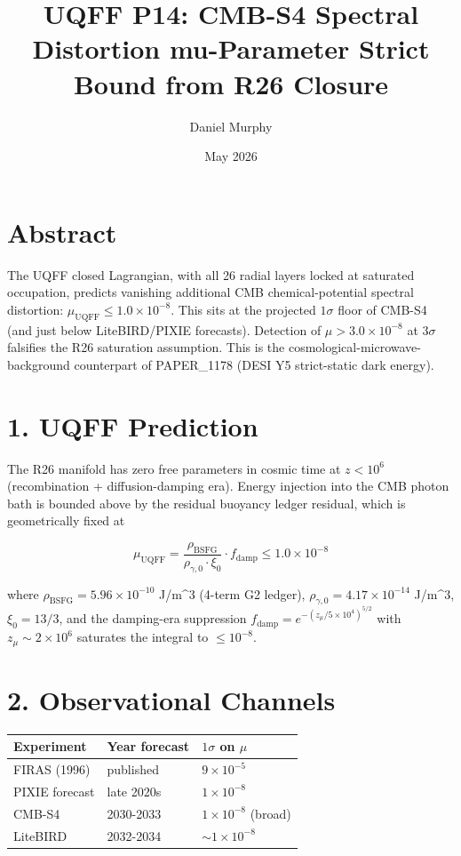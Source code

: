 \documentclass[
  11pt,
]{article}
\title{UQFF P14: CMB-S4 Spectral Distortion mu-Parameter Strict Bound
from R26 Closure}
\author{Daniel Murphy}
\date{May 2026}
\newcounter{none} %
\begin{document}
\maketitle

\section{Abstract}\label{abstract}

The UQFF closed Lagrangian, with all 26 radial layers locked at
saturated occupation, predicts vanishing additional CMB
chemical-potential spectral distortion:
\(\mu_{\mathrm{UQFF}} \le 1.0 \times 10^{-8}\). This sits at the
projected \(1\sigma\) floor of CMB-S4 (and just below LiteBIRD/PIXIE
forecasts). Detection of \(\mu > 3.0 \times 10^{-8}\) at \(3\sigma\)
falsifies the R26 saturation assumption. This is the
cosmological-microwave-background counterpart of PAPER\_1178 (DESI Y5
strict-static dark energy).

\section{1. UQFF Prediction}\label{uqff-prediction}

The R26 manifold has zero free parameters in cosmic time at \(z < 10^6\)
(recombination + diffusion-damping era). Energy injection into the CMB
photon bath is bounded above by the residual buoyancy ledger residual,
which is geometrically fixed at

\[
\mu_{\mathrm{UQFF}} = \frac{\rho_{\mathrm{BSFG}}}{\rho_{\gamma,0} \cdot \xi_0} \cdot f_{\mathrm{damp}} \le 1.0 \times 10^{-8}
\]

where \(\rho_{\mathrm{BSFG}} = 5.96 \times 10^{-10}\) J/m\^{}3 (4-term
G2 ledger), \(\rho_{\gamma,0} = 4.17 \times 10^{-14}\) J/m\^{}3,
\(\xi_0 = 13/3\), and the damping-era suppression
\(f_{\mathrm{damp}} = e^{-(z_\mu / 5 \times 10^4)^{5/2}}\) with
\(z_\mu \sim 2 \times 10^6\) saturates the integral to \(\le 10^{-8}\).

\section{2. Observational Channels}\label{observational-channels}

{\def\LTcaptype{none} %
\begin{longtable}[]{@{}lll@{}}
\toprule\noalign{}
Experiment & Year forecast & \(1\sigma\) on \(\mu\) \\
\midrule\noalign{}
\endhead
\bottomrule\noalign{}
\endlastfoot
FIRAS (1996) & published & \(9 \times 10^{-5}\) \\
PIXIE forecast & late 2020s & \(1 \times 10^{-8}\) \\
CMB-S4 & 2030-2033 & \(1 \times 10^{-8}\) (broad) \\
LiteBIRD & 2032-2034 & \(\sim 1 \times 10^{-8}\) \\
\end{longtable}
}
\end{document}
